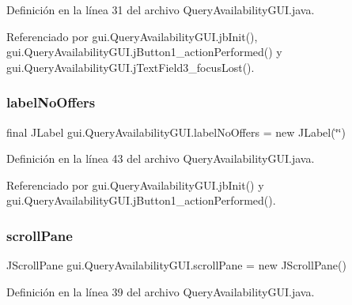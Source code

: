 Definición en la línea 31 del archivo Query\+Availability\+G\+U\+I.\+java.



Referenciado por gui.\+Query\+Availability\+G\+U\+I.\+jb\+Init(), gui.\+Query\+Availability\+G\+U\+I.\+j\+Button1\+\_\+action\+Performed() y gui.\+Query\+Availability\+G\+U\+I.\+j\+Text\+Field3\+\_\+focus\+Lost().

\mbox{\label{classgui_1_1_query_availability_g_u_i_abff167ce816f1e66d905be0a65c6c6b8}} 
\subsubsection{\texorpdfstring{labelNoOffers}{labelNoOffers}}
{\footnotesize\ttfamily final J\+Label gui.\+Query\+Availability\+G\+U\+I.\+label\+No\+Offers = new J\+Label(\char`\"{}\char`\"{})\hspace{0.3cm}{\ttfamily [private]}}



Definición en la línea 43 del archivo Query\+Availability\+G\+U\+I.\+java.



Referenciado por gui.\+Query\+Availability\+G\+U\+I.\+jb\+Init() y gui.\+Query\+Availability\+G\+U\+I.\+j\+Button1\+\_\+action\+Performed().

\mbox{\label{classgui_1_1_query_availability_g_u_i_a897b97b35fa12333a40c1f043ae8568c}} 
\subsubsection{\texorpdfstring{scrollPane}{scrollPane}}
{\footnotesize\ttfamily J\+Scroll\+Pane gui.\+Query\+Availability\+G\+U\+I.\+scroll\+Pane = new J\+Scroll\+Pane()\hspace{0.3cm}{\ttfamily [private]}}



Definición en la línea 39 del archivo Query\+Availability\+G\+U\+I.\+java.



